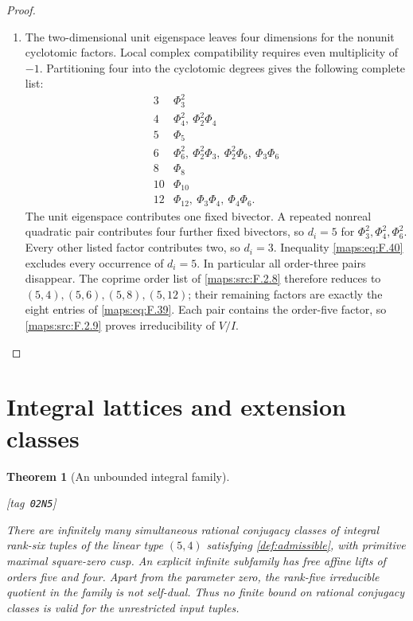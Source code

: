 \documentclass[11pt,a4paper]{article}
\numberwithin{equation}{section}
\newtheorem{theorem}{Theorem}[section]
\theoremstyle{definition}
\newcommand{\StatementRecord}[4]{{\upshape\footnotesize[tag~\texttt{#3}]}\enspace\ignorespaces}
\begin{document}
\begin{proof}
\begin{enumerate}[label=\arabic*.]
\item The two-dimensional unit eigenspace leaves four dimensions
for the nonunit cyclotomic factors.  Local complex compatibility
requires even multiplicity of $-1$.  Partitioning four into the
cyclotomic degrees gives the following complete list:
\[
\begin{array}{c|l}
3&\Phi_3^2\\
4&\Phi_4^2,\ \Phi_2^2\Phi_4\\
5&\Phi_5\\
6&\Phi_6^2,\ \Phi_2^2\Phi_3,\ \Phi_2^2\Phi_6,\ \Phi_3\Phi_6\\
8&\Phi_8\\
10&\Phi_{10}\\
12&\Phi_{12},\ \Phi_3\Phi_4,\ \Phi_4\Phi_6.
\end{array}
\]
The unit eigenspace contributes one fixed bivector.  A repeated
nonreal quadratic pair contributes four further fixed bivectors,
so $d_i=5$ for $\Phi_3^2,\Phi_4^2,\Phi_6^2$.
Every other listed factor contributes two, so $d_i=3$.
Inequality \eqref{maps:eq:F.40} excludes every occurrence of
$d_i=5$.  In particular all order-three pairs disappear.
The coprime order list of \cref{maps:src:F.2.8} therefore reduces
to $(5,4),(5,6),(5,8),(5,12)$; their remaining factors are exactly
the eight entries of \eqref{maps:eq:F.39}.
Each pair contains the order-five factor, so
\cref{maps:src:F.2.9} proves irreducibility of $V/I$.
\end{enumerate}
\end{proof}







\section{Integral lattices and extension classes}\label{pub:V:sec-lattices}

\begin{theorem}[An unbounded integral family]\hypertarget{tag-02N5}{}\label{maps:src:F.2.16}
\StatementRecord{maps:src:F.2.16}{proved}{02N5}{\eqref{maps:eq:F.U1}, \eqref{maps:eq:F.U3}, \eqref{maps:eq:F.U4}, \eqref{maps:eq:F.U5}, \eqref{maps:eq:F.U6}, \eqref{maps:eq:F.U7}, \cref{maps:src:F.2.5}}


There are infinitely many simultaneous rational conjugacy classes
of integral rank-six tuples of the linear type $(5,4)$ satisfying \cref{def:admissible},
with primitive maximal square-zero cusp.  An explicit infinite
subfamily has free affine lifts of orders five and four.
Apart from the parameter zero, the rank-five irreducible quotient
in the family is not self-dual.  Thus no finite bound on rational
conjugacy classes is valid for the unrestricted input tuples.


\end{theorem}
\end{document}
